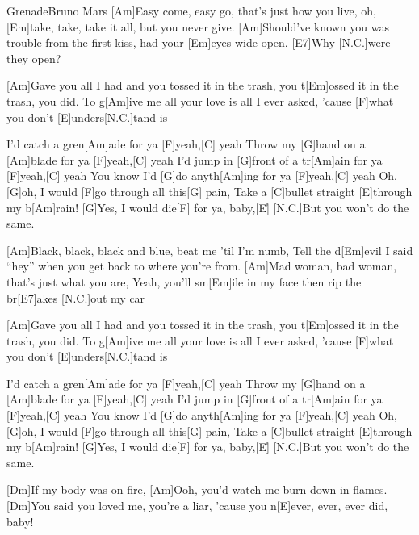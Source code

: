 \documentclass[../main.tex]{subfiles}
\begin{document}
\begin{song}[5]{Grenade}{Bruno Mars}{}
[Am]Easy come, easy go, that's just how you live, oh, [Em]take, take, take it all, but you never give.
[Am]Should've known you was trouble from the first kiss, had your [Em]eyes wide open.
[E7]Why [N.C.]were they open?

[Am]Gave you all I had and you tossed it in the trash, you t[Em]ossed it in the trash, you did.
To g[Am]ive me all your love is all I ever asked, 'cause [F]what you don't [E]unders[N.C.]tand is

I'd catch a gren[Am]ade for ya [F]yeah,[C] yeah
Throw my [G]hand on a [Am]blade for ya [F]yeah,[C] yeah
I'd jump in [G]front of a tr[Am]ain for ya [F]yeah,[C] yeah
You know I'd [G]do anyth[Am]ing for ya [F]yeah,[C] yeah
Oh, [G]oh, I would [F]go through all this[G] pain,
Take a [C]bullet straight [E]through my b[Am]rain!
[G]Yes, I would die[F] for ya, baby,[E]{\h}
[N.C.]But you won't do the same.

[Am]Black, black, black and blue, beat me 'til I'm numb,
Tell the d[Em]evil I said ``hey'' when you get back to where you're from.
[Am]Mad woman, bad woman, that's just what you are,
Yeah, you'll sm[Em]ile in my face then rip the br[E7]akes [N.C.]out my car

[Am]Gave you all I had and you tossed it in the trash, you t[Em]ossed it in the trash, you did.
To g[Am]ive me all your love is all I ever asked, 'cause [F]what you don't [E]unders[N.C.]tand is

I'd catch a gren[Am]ade for ya [F]yeah,[C] yeah
Throw my [G]hand on a [Am]blade for ya [F]yeah,[C] yeah
I'd jump in [G]front of a tr[Am]ain for ya [F]yeah,[C] yeah
You know I'd [G]do anyth[Am]ing for ya [F]yeah,[C] yeah
Oh, [G]oh, I would [F]go through all this[G] pain,
Take a [C]bullet straight [E]through my b[Am]rain!
[G]Yes, I would die[F] for ya, baby,[E]{\h}
[N.C.]But you won't do the same.

[Dm]If my body was on fire,
[Am]Ooh, you'd watch me burn down in flames.
[Dm]You said you loved me, you're a liar,
'cause you n[E]ever, ever, ever did, baby!


\end{song}
\end{document}
